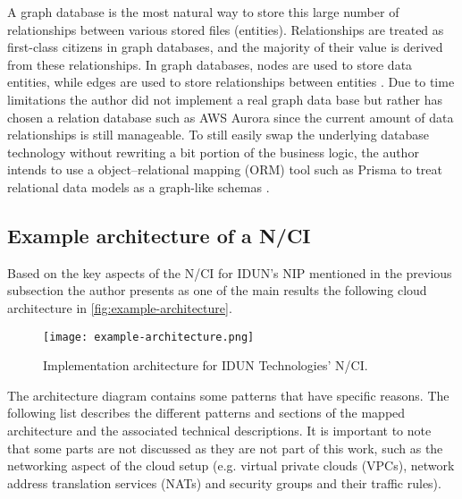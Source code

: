 A graph database is the most natural way to store this large number of relationships between various stored files (entities). Relationships are treated as first-class citizens in graph databases, and the majority of their value is derived from these relationships. In graph databases, nodes are used to store data entities, while edges are used to store relationships between entities \citep{amazon_web_services_inc_what_nodate}. Due to time limitations the author did not implement a real graph data base but rather has chosen a relation database such as AWS Aurora since the current amount of data relationships is still manageable. To still easily swap the underlying database technology without rewriting a bit portion of the business logic, the author intends to use a object–relational mapping (ORM) tool such as Prisma to treat relational data models as a graph-like schemas \citep{prisma_data_nodate}.

\subsection{Example architecture of a N/CI}
\label{chapter5-example-architecture-of-a-nci}

Based on the key aspects of the N/CI for IDUN's NIP mentioned in the previous subsection the author presents as one of the main results the following cloud architecture in \autoref{fig:example-architecture}.

\begin{figure}[!ht]
  \centering
  \texttt{[image: example-architecture.png]}
  \caption{Implementation architecture for IDUN Technologies' N/CI.}
  \label{fig:example-architecture}
\end{figure}

The architecture diagram contains some patterns that have specific reasons. The following list describes the different patterns and sections of the mapped architecture and the associated technical descriptions. It is important to note that some parts are not discussed as they are not part of this work, such as the networking aspect of the cloud setup (e.g. virtual private clouds (VPCs), network address translation services (NATs) and security groups and their traffic rules).

